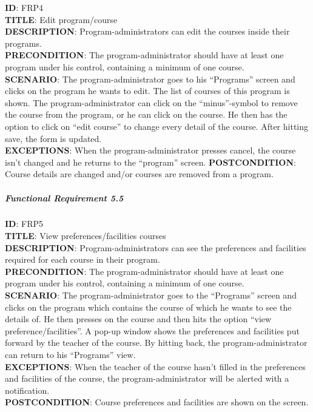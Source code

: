 \documentclass[9pt]{article}
\begin{document}
\textbf{ID}: FRP4\\\textbf{TITLE}: Edit
program/course\\\textbf{DESCRIPTION}: Program-administrators can edit
the courses inside their programs.\\\textbf{PRECONDITION}: The
program-administrator should have at least one program under his
control, containing a minimum of one course.\\\textbf{SCENARIO}: The
program-administrator goes to his ``Programs'' screen and clicks on the
program he wants to edit. The list of courses of this program is shown.
The program-administrator can click on the ``minus''-symbol to remove
the course from the program, or he can click on the course. He then has
the option to click on ``edit course'' to change every detail of the
course. After hitting save, the form is updated.\\\textbf{EXCEPTIONS}:
When the program-administrator presses cancel, the course isn't changed
and he returns to the ``program'' screen. \textbf{POSTCONDITION}: Course
details are changed and/or courses are removed from a program.

\subparagraph{Functional Requirement
5.5}\label{functional-requirement-5.5}

\textbf{ID}: FRP5\\\textbf{TITLE}: View preferences/facilities
courses\\\textbf{DESCRIPTION}: Program-administrators can see the
preferences and facilities required for each course in their
program.\\\textbf{PRECONDITION}: The program-administrator should have
at least one program under his control, containing a minimum of one
course.\\\textbf{SCENARIO}: The program-administrator goes to the
``Programs'' screen and clicks on the program which contains the course
of which he wants to see the details of. He then presses on the course
and then hits the option ``view preference/facilities''. A pop-up window
shows the preferences and facilities put forward by the teacher of the
course. By hitting back, the program-administrator can return to his
``Programs'' view.\\\textbf{EXCEPTIONS}: When the teacher of the course
hasn't filled in the preferences and facilities of the course, the
program-administrator will be alerted with a
notification.\\\textbf{POSTCONDITION}: Course preferences and facilities
are shown on the screen.
\end{document}
